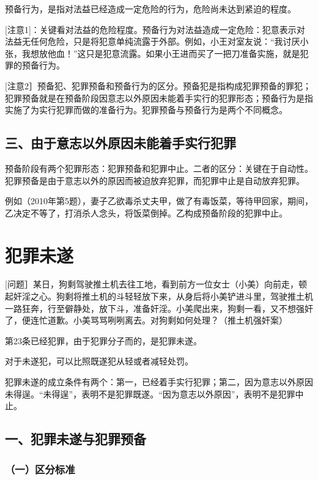 预备行为，是指对法益已经造成一定危险的行为，危险尚未达到紧迫的程度。

[注意1]：关键看对法益的危险程度。预备行为对法益造成一定危险：犯意表示对法益无任何危险，只是将犯意单纯流露于外部。例如，小王对室友说：“我讨厌小张，我想放他血！”这只是犯意流露。如果小王进而买了一把刀准备实施，就是犯罪的预备行为。

[注意2］预备犯、犯罪预备和预备行为的区分。预备犯是指构成犯罪预备的罪犯；犯罪预备就是在预备阶段因意志以外原因未能着手实行的犯罪形态；预备行为是指实施了为实行犯罪而做的准备行为。犯罪预备与预备行为是两个不同概念。

\subsection*{三、由于意志以外原因未能着手实行犯罪}

预备阶段有两个犯罪形态：犯罪预备和犯罪中止。二者的区分：关键在于自动性。犯罪预备是由于意志以外的原因而被迫放弃犯罪，而犯罪中止是自动放弃犯罪。

例如（2010年第5题），妻子乙欲毒杀丈夫甲，做了有毒饭菜，等待甲回家，期间，乙决定不等了，打消杀人念头，将饭菜倒掉。乙构成预备阶段的犯罪中止。

\section{犯罪未遂}

[问题］某日，狗剩驾驶推土机去往工地，看到前方一位女士（小美）向前走，顿起奸淫之心。狗剩将推土机的斗轻轻放下来，从身后将小美铲进斗里，驾驶推土机一路狂奔，行至僻静处，放下斗，准备奸淫。小美爬出来，狗剩一看，又不想强奸了，便连忙道歉。小美骂骂咧咧离去。对狗剩如何处理？（推土机强奸案）

第23条已经犯罪，由于犯罪分子而的，是犯罪未遂。

对于未遂犯，可以比照既遂犯从轻或者减轻处罚。

犯罪未遂的成立条件有两个：第一，已经着手实行犯罪；第二，因为意志以外原因未得逞。“未得逞”，表明不是犯罪既遂。“因为意志以外原因”，表明不是犯罪中止。

\subsection*{一、犯罪未遂与犯罪预备}

\subsubsection*{（一）区分标准}

